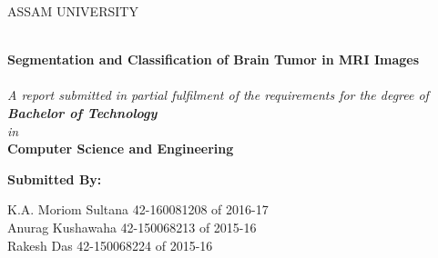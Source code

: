 \documentclass[10pt, oneside]{Thesis} %
\begin{document}
\begin{titlepage}
\begin{center}
{\scshape\LARGE ASSAM UNIVERSITY \par}\vspace{1.5cm}

\HRule \\[0.4cm] %
{\huge \textbf{Segmentation and Classification of Brain Tumor in MRI Images}}\\[0.3cm] %
\HRule \\[1.5cm] %

\large \textit{A report submitted in partial fulfilment of the requirements for the degree of \\ \textbf{ Bachelor of Technology}}\\[0.3cm] %
\textit{in }\\ \textbf{Computer Science and Engineering}


 
\begin{minipage}[t]{0.8\textwidth}
\begin{center}
  \textbf{Submitted By:}\\
  \begin{flushleft}
  K.A. Moriom Sultana \hspace{3.0cm} 42-160081208 of 2016-17\\
  Anurag Kushawaha \hspace{3.4cm} 42-150068213 of 2015-16\\
  Rakesh Das \hspace{4.8cm} 42-150068224 of 2015-16\\ %
 \end{flushleft}
\end{center} \large



\end{minipage}
\end{center}
\end{titlepage}
\end{document}

